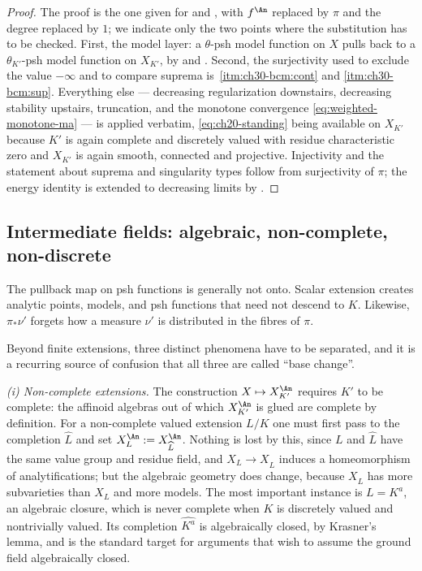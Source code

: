 \begin{proof}
The proof is the one given for  and
, with \(f^{\An}\) replaced by
\(\pi\) and the degree replaced by \(1\); we indicate only the two points
where the substitution has to be checked.  First, the model layer: a
\(\theta\)-psh model function on \(X\) pulls back to a
\(\theta_{K'}\)-psh model function on \(X_{K'}\), by
 and
.  Second, the surjectivity used
to exclude the value \(-\infty\) and to compare suprema is
\,\cref{itm:ch30-bcm:cont} and
\cref{itm:ch30-bcm:sup}.  Everything else --- decreasing regularization
downstairs, decreasing stability upstairs, truncation, and the monotone
convergence \eqref{eq:weighted-monotone-ma} --- is applied verbatim,
\eqref{eq:ch20-standing} being available on \(X_{K'}\) because \(K'\) is
again complete and discretely valued with residue characteristic zero and
\(X_{K'}\) is again smooth, connected and projective.  Injectivity and the
statement about suprema and singularity types follow from surjectivity of
\(\pi\); the energy identity is
 extended to decreasing limits by
.
\end{proof}

\subsection{Intermediate fields: algebraic, non-complete, non-discrete}
\label{sec:ch30-bc-beyond}

The pullback map on psh functions is generally not onto.  Scalar extension
creates analytic points, models, and psh functions that need not descend to
\(K\).  Likewise, \(\pi_*\nu'\) forgets how a measure \(\nu'\) is
distributed in the fibres of \(\pi\).

Beyond finite extensions, three distinct phenomena have to be separated,
and it is a recurring source of confusion that all three are called
``base change''.

\emph{(i) Non-complete extensions.}  The construction \(X\mapsto X_{K'}^{\An}\)
requires \(K'\) to be complete: the affinoid algebras out of which
\(X_{K'}^{\An}\) is glued are complete by definition.  For a non-complete
valued extension \(L/K\) one must first pass to the completion
\(\widehat L\) and set \(X_L^{\An}:=X_{\widehat L}^{\An}\).  Nothing is lost
by this, since \(L\) and \(\widehat L\) have the same value group and
residue field, and \(X_L\to X_{\widehat L}\) induces a homeomorphism of
analytifications; but the algebraic geometry does change, because
\(X_{\widehat L}\) has more subvarieties than \(X_L\) and more models.  The
most important instance is \(L=K^{a}\), an algebraic closure, which is never
complete when \(K\) is discretely valued and nontrivially valued.  Its
completion \(\widehat{K^{a}}\) is algebraically closed, by Krasner's lemma,
and is the standard target for arguments that wish to assume the ground
field algebraically closed.


